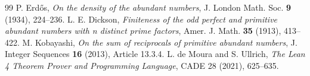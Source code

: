 \documentclass[11pt,a4paper]{article}
\theoremstyle{definition}
\begin{document}
\begin{thebibliography}{99}
 P. Erd\H{o}s, \textit{On the density of the abundant numbers}, J. London Math. Soc. \textbf{9} (1934), 224--236.
 L. E. Dickson, \textit{Finiteness of the odd perfect and primitive abundant numbers with n distinct prime factors}, Amer. J. Math. \textbf{35} (1913), 413--422.
 M. Kobayashi, \textit{On the sum of reciprocals of primitive abundant numbers}, J. Integer Sequences \textbf{16} (2013), Article 13.3.4.
 L. de Moura and S. Ullrich, \textit{The Lean 4 Theorem Prover and Programming Language}, CADE 28 (2021), 625--635.
\end{thebibliography}
\end{document}
